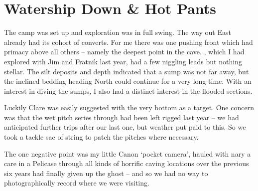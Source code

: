 \section{Watership Down \& Hot Pants}



The camp was set up and exploration was in full swing. The way out East
already had its cohort of converts. For me there was one pushing front
which had primacy above all others -- namely the deepest point in the
cave. , which I had explored with Jim and Fratnik
last year, had a few niggling leads but nothing stellar. The silt
deposits and depth indicated that a sump was not far away, but the
inclined bedding heading North could continue for a very long time. With
an interest in diving the sumps, I also had a distinct interest in the
flooded sections.

Luckily Clare was easily suggested with the very bottom as a target. One
concern was that the wet pitch series through  had been left
rigged last year -- we had anticipated further trips after our last one,
but weather put paid to this. So we took a tackle sac of string to patch
the pitches where necessary.

The one negative point was my little Canon `pocket camera', hauled with
nary a care in a Pelicase through all kinds of horrific caving locations
over the previous six years had finally given up the ghost -- and so we
had no way to photographically record where we were visiting.

